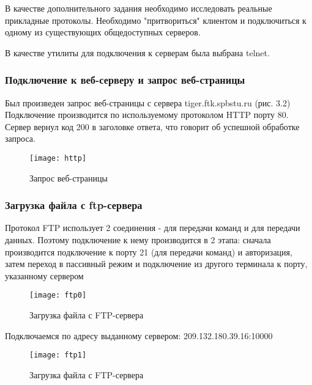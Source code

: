 В качестве дополнительного задания необходимо исследовать реальные прикладные протоколы. Необходимо "притвориться" клиентом и подключиться к одному из существующих общедоступных серверов.

В качестве утилиты для подключения к серверам была выбрана telnet.

\subsubsection{Подключение к веб-серверу и запрос веб-страницы}

Был произведен запрос веб-страницы с сервера tiger.ftk.spbstu.ru (рис. 3.2) Подключение производится по используемому протоколом HTTP порту 80. Сервер вернул код 200 в заголовке ответа, что говорит об успешной обработке запроса.

\begin{figure}[H]
	\begin{center}
		\texttt{[image: http]}
		\caption{Запрос веб-страницы} 
		\label{pic:pic_name} %
	\end{center}
\end{figure}

\subsubsection{Загрузка файла с ftp-сервера}

Протокол FTP использует 2 соединения - для передачи команд и для передачи данных. Поэтому подключение к нему производится в 2 этапа: сначала производится подключение к порту 21 (для передачи команд) и авторизация, затем переход в пассивный режим и подключение из другого терминала к порту, указанному сервером 
\begin{figure}[H]
	\begin{center}
		\texttt{[image: ftp0]}
		\caption{Загрузка файла с FTP-сервера} 
		\label{pic:pic_name} %
	\end{center}
\end{figure}

Подключаемся по адресу выданному сервером: 209.132.180.39.16:10000

\begin{figure}[H]
	\begin{center}
		\texttt{[image: ftp1]}
		\caption{Загрузка файла с FTP-сервера} 
		\label{pic:pic_name} %
	\end{center}
\end{figure}

